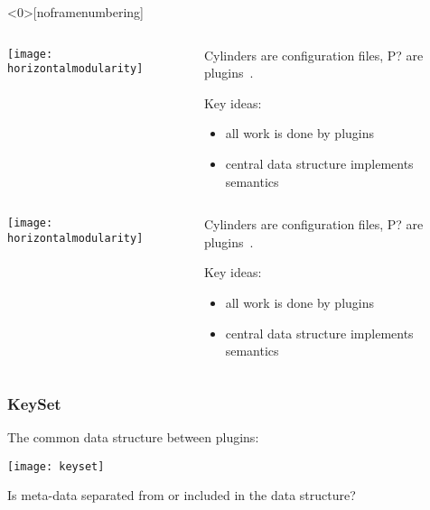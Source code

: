\begin{frame}<0>[noframenumbering]
	\begin{columns}[c]
	\begin{column}{7cm}
	\texttt{[image: horizontalmodularity]}
	\end{column}
	\begin{column}{4cm}
	Cylinders are configuration files, P? are plugins~\cite{raab2016improving}.

	Key ideas:
	\begin{itemize}
	\item all work is done by plugins
	\item central data structure implements semantics
	\end{itemize}
	\end{column}
	\end{columns}
\end{frame}

\begin{frame}
	\begin{columns}[c]
	\begin{column}{7cm}
	\texttt{[image: horizontalmodularity]}
	\end{column}
	\begin{column}{4cm}
	Cylinders are configuration files, P? are plugins~\cite{raab2016improving}.

	Key ideas:
	\begin{itemize}
	\item all work is done by plugins
	\item central data structure implements semantics
	\end{itemize}
	\end{column}
	\end{columns}
\end{frame}

\begin{frame}
	\frametitle{KeySet}

	The common data structure between plugins:
	\vspace{1cm}

	\texttt{[image: keyset]}
\end{frame}

\begin{assignment}
	\begin{task}
	Is meta-data separated from or included in the data structure?
	\end{task}
\end{assignment}

